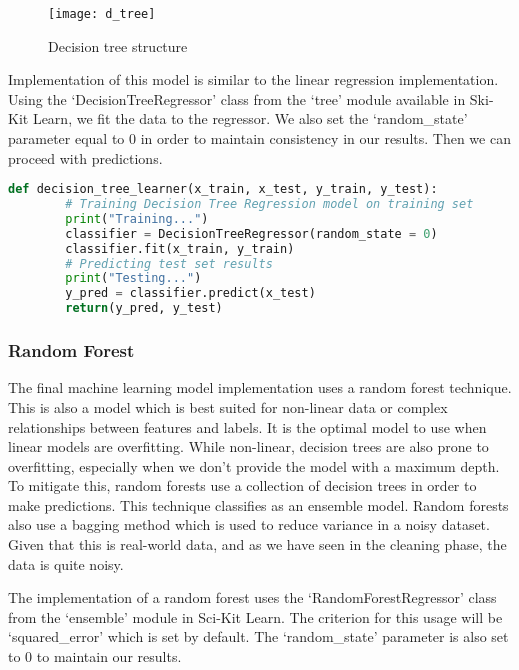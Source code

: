 \documentclass[12pt]{article}
\renewcommand{\baselinestretch}{2}
\begin{document}
        \begin{figure}[H]
            \centering
            \texttt{[image: d\_tree]}
            \caption{Decision tree structure}
        \end{figure}

        Implementation of this model is similar to the linear regression implementation. Using the `DecisionTreeRegressor' class from the `tree' module available 
        in Ski-Kit Learn, we fit the data to the regressor. We also set the `random\_state' parameter equal to 0 in order to maintain consistency in our results. 
        Then we can proceed with predictions.

        \renewcommand{\baselinestretch}{1.5}
        \begin{lstlisting}[language=Python, caption=Linear regression implementation]
    def decision_tree_learner(x_train, x_test, y_train, y_test):    
        # Training Decision Tree Regression model on training set
        print("Training...")
        classifier = DecisionTreeRegressor(random_state = 0)
        classifier.fit(x_train, y_train)
        # Predicting test set results
        print("Testing...")
        y_pred = classifier.predict(x_test)
        return(y_pred, y_test)
        \end{lstlisting}
        \renewcommand{\baselinestretch}{2}

        \subsubsection{Random Forest}
        The final machine learning model implementation uses a random forest technique. This is also a model which is best suited for 
        non-linear data or complex relationships between features and labels. It is the optimal model to use when linear models are overfitting.
        While non-linear, decision trees are also prone to overfitting, especially when we don't provide the model with a maximum depth.
        To mitigate this, random forests use a collection of decision trees in order to make predictions. This technique classifies as an ensemble model.
        Random forests also use a bagging method which is used to reduce variance in a noisy dataset. Given that this is real-world data, and as we have seen 
        in the cleaning phase, the data is quite noisy. 

        The implementation of a random forest uses the `RandomForestRegressor' class from the `ensemble' module in Sci-Kit Learn. The criterion for this 
        usage will be `squared\_error' which is set by default. The `random\_state' parameter is also set to 0 to maintain our results.
\end{document}
